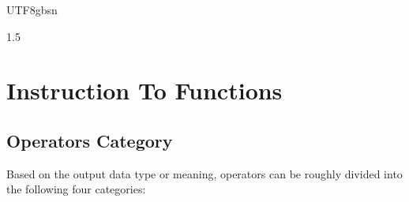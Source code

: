\documentclass{article}
\begin{document}
\begin{CJK}{UTF8}{gbsn}
\begin{spacing}{1.5}
%
%
%
%
%
%












\section{Instruction To Functions}

\subsection{Operators Category}

Based on the output data type or meaning, operators can be roughly divided into the following four categories:\\




\end{spacing}
\end{CJK}
\end{document}
